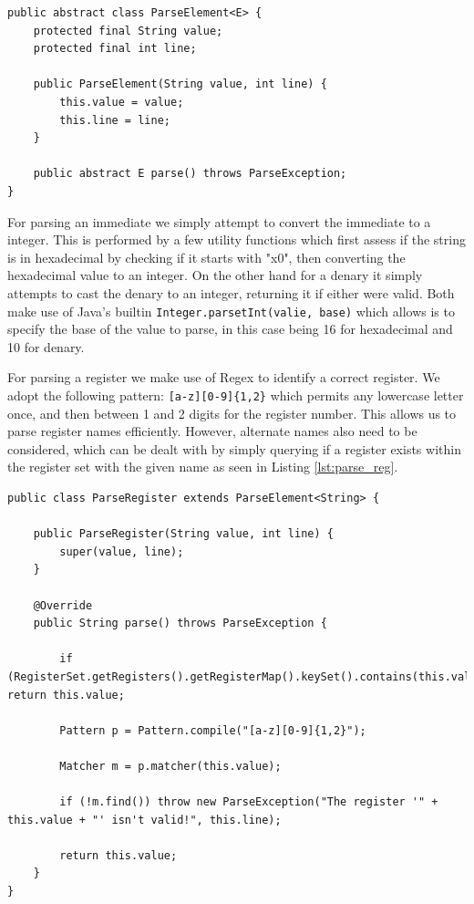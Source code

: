 \begin{lstlisting}[caption=ParseElement generic abstract class, label=lst:parse_element]
public abstract class ParseElement<E> {
    protected final String value;
    protected final int line;

    public ParseElement(String value, int line) {
        this.value = value;
        this.line = line;
    }

    public abstract E parse() throws ParseException;
}
\end{lstlisting}

For parsing an immediate we simply attempt to convert the immediate to a integer. This is performed by a few utility functions which first assess if the string is in hexadecimal by checking if it starts with "x0", then converting the hexadecimal value to an integer. On the other hand for a denary it simply attempts to cast the denary to an integer, returning it if either were valid. Both make use of Java's builtin \verb|Integer.parsetInt(valie, base)| which allows is to specify the base of the value to parse, in this case being 16 for hexadecimal and 10 for denary.

For parsing a register we make use of Regex to identify a correct register. We adopt the following pattern: \verb|[a-z][0-9]{1,2}| which permits any lowercase letter once, and then between 1 and 2 digits for the register number. This allows us to parse register names efficiently. However, alternate names also need to be considered, which can be dealt with by simply querying if a register exists within the register set with the given name as seen in Listing \ref{lst:parse_reg}.

\begin{lstlisting}[caption=Register Parsing class, label=lst:parse_reg]
public class ParseRegister extends ParseElement<String> {

    public ParseRegister(String value, int line) {
        super(value, line);
    }

    @Override
    public String parse() throws ParseException {

        if (RegisterSet.getRegisters().getRegisterMap().keySet().contains(this.value)) return this.value;

        Pattern p = Pattern.compile("[a-z][0-9]{1,2}");

        Matcher m = p.matcher(this.value);

        if (!m.find()) throw new ParseException("The register '" + this.value + "' isn't valid!", this.line);

        return this.value;
    }
}
\end{lstlisting}

